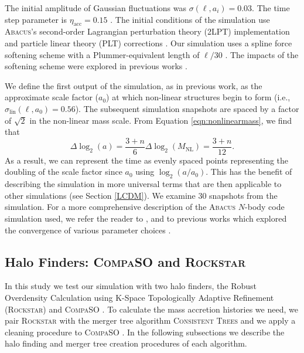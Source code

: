The initial amplitude of Gaussian fluctuations was $\sigma(\ell, a_i) = 0.03$. The time step parameter is $\eta_\mathrm{acc} = 0.15$ \cite[see][for further discussion]{Joyce_2021}. The initial conditions of the simulation use \textsc{Abacus}'s second-order Lagrangian perturbation theory (2LPT) implementation and particle linear theory (PLT) corrections \cite{Garrison_2016}. Our simulation uses a spline force softening scheme \cite[see descriptions in][]{Garrison_2016} with a Plummer-equivalent length of $\ell/30$ \cite{Plummer_1911}. The impacts of the softening scheme were explored in previous works \cite[e.g.,][]{Garrison_2021_softening, Maleubre_2022}. 

We define the first output of the simulation, as in previous work, as the approximate scale factor ($a_0$) at which non-linear structures begin to form (i.e., $\sigma_{\mathrm{lin}}(\ell, a_0) = 0.56$). The subsequent simulation snapshots are spaced by a factor of $\sqrt{2}$ in the non-linear mass scale. From Equation \ref{eqn:nonlinearmass}, we find that
\begin{equation}\label{eqn:log_a_spacing}
    \Delta \log_2(a) = \frac{3 + n}{6} \Delta \log_2(M_{\mathrm{NL}}) = \frac{3+n}{12}.
\end{equation}
As a result, we can represent the time as evenly spaced points representing the doubling of the scale factor since $a_0$ using $\log_2(a/a_0)$. This has the benefit of describing the simulation in more universal terms that are then applicable to other simulations (see Section \ref{LCDM}). We examine 30 snapshots from the simulation. For a more comprehensive description of the \textsc{Abacus} $N$-body code simulation used, we refer the reader to \cite{Maleubre_2024}, and to previous works which explored the convergence of various parameter choices \cite[][]{Joyce_2021, Garrison_2021_softening, Maleubre_2022}.

\subsection{Halo Finders: \textsc{CompaSO} and \textsc{Rockstar}}\label{finders_descriptions}
In this study we test our simulation with two halo finders, the Robust Overdensity Calculation using K-Space Topologically Adaptive Refinement (\textsc{Rockstar}) \cite{Rockstar} and \textsc{CompaSO} \cite{CompaSO}. To calculate the mass accretion histories we need, we pair \textsc{Rockstar} with the merger tree algorithm \textsc{Consistent Trees} \cite{Consistent_trees} and we apply a cleaning procedure to \textsc{CompaSO} \cite{CompaSO_Merger_Trees}. In the following subsections we describe the halo finding and merger tree creation procedures of each algorithm.


